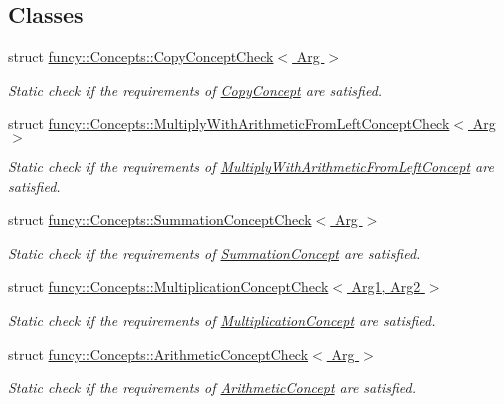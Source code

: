 \subsection*{Classes}
\begin{DoxyCompactItemize}
\item 
struct \hyperlink{structfuncy_1_1Concepts_1_1CopyConceptCheck}{funcy\-::\-Concepts\-::\-Copy\-Concept\-Check$<$ Arg $>$}
\begin{DoxyCompactList}\small\item\em Static check if the requirements of \hyperlink{structfuncy_1_1Concepts_1_1CopyConcept}{Copy\-Concept} are satisfied. \end{DoxyCompactList}\item 
struct \hyperlink{structfuncy_1_1Concepts_1_1MultiplyWithArithmeticFromLeftConceptCheck}{funcy\-::\-Concepts\-::\-Multiply\-With\-Arithmetic\-From\-Left\-Concept\-Check$<$ Arg $>$}
\begin{DoxyCompactList}\small\item\em Static check if the requirements of \hyperlink{structfuncy_1_1Concepts_1_1MultiplyWithArithmeticFromLeftConcept}{Multiply\-With\-Arithmetic\-From\-Left\-Concept} are satisfied. \end{DoxyCompactList}\item 
struct \hyperlink{structfuncy_1_1Concepts_1_1SummationConceptCheck}{funcy\-::\-Concepts\-::\-Summation\-Concept\-Check$<$ Arg $>$}
\begin{DoxyCompactList}\small\item\em Static check if the requirements of \hyperlink{structfuncy_1_1Concepts_1_1SummationConcept}{Summation\-Concept} are satisfied. \end{DoxyCompactList}\item 
struct \hyperlink{structfuncy_1_1Concepts_1_1MultiplicationConceptCheck}{funcy\-::\-Concepts\-::\-Multiplication\-Concept\-Check$<$ Arg1, Arg2 $>$}
\begin{DoxyCompactList}\small\item\em Static check if the requirements of \hyperlink{structfuncy_1_1Concepts_1_1MultiplicationConcept}{Multiplication\-Concept} are satisfied. \end{DoxyCompactList}\item 
struct \hyperlink{structfuncy_1_1Concepts_1_1ArithmeticConceptCheck}{funcy\-::\-Concepts\-::\-Arithmetic\-Concept\-Check$<$ Arg $>$}
\begin{DoxyCompactList}\small\item\em Static check if the requirements of \hyperlink{structfuncy_1_1Concepts_1_1ArithmeticConcept}{Arithmetic\-Concept} are satisfied. \end{DoxyCompactList}\item 

\end{DoxyCompactItemize}
